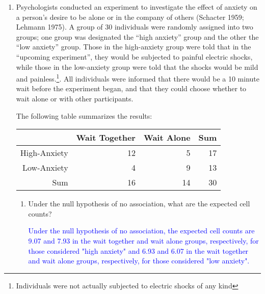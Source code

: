 \documentclass[letterpaper,12pt,twoside,]{pinp}
\begin{document}
\begin{enumerate}
  \begin{ShadedResult}
   \begin{verbatim}
   #  [1] 0.009530323
   \end{verbatim}
   \end{ShadedResult}
\item
  Psychologists conducted an experiment to investigate the effect of
  anxiety on a person's desire to be alone or in the company of others
  (Schacter 1959; Lehmann 1975). A group of 30 individuals were randomly
  assigned into two groups; one group was designated the ``high
  anxiety'' group and the other the ``low anxiety'' group. Those in the
  high-anxiety group were told that in the ``upcoming experiment'', they
  would be subjected to painful electric shocks, while those in the
  low-anxiety group were told that the shocks would be mild and
  painless.\footnote{Individuals were not actually subjected to electric shocks of any kind}.
  All individuals were informed that there would be a 10 minute wait
  before the experiment began, and that they could choose whether to
  wait alone or with other participants.

  The following table summarizes the results:

  \begin{table}[h]
   \centering
   \begin{tabular}{rrr|r}
       \hline
       & Wait Together & Wait Alone & Sum \\ 
       \hline
       High-Anxiety & 12 & 5 & 17 \\ 
       Low-Anxiety & 4 & 9 & 13 \\ 
       \hline
       Sum & 16 & 14 & 30 \\ 
       \hline
   \end{tabular}
   \end{table}

  \begin{enumerate}
  \def\labelenumii{\alph{enumii})}
  \item
    Under the null hypothesis of no association, what are the expected
    cell counts?

    \textcolor{blue}{Under the null hypothesis of no association, the expected cell counts are 9.07 and 7.93 in the wait together and wait alone groups, respectively, for those considered "high anxiety" and 6.93 and 6.07 in the wait together and wait alone groups, respectively, for those considered "low anxiety".}
  \end{enumerate}


\end{enumerate}
\end{document}
